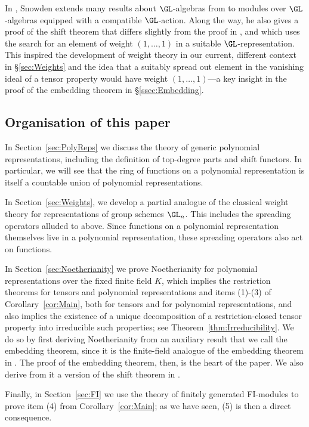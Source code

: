 \documentclass{amsart}
\begin{document}
In \cite{Snowden21}, Snowden extends many results about $\GL$-algebras
from \cite{Bik21} to modules over $\GL$-algebras equipped with a
compatible $\GL$-action.  Along the way, he also gives a proof of the
shift theorem that differs slightly from the proof in \cite{Bik21}, and
which uses the search for an element of weight $(1,\ldots,1)$ in a suitable
$\GL$-representation. This inspired the development of weight theory
in our current, different context in \S\ref{sec:Weights} and the idea
that a suitably spread out element in the vanishing ideal of a tensor
property would have weight $(1,\ldots,1)$---a key insight in the proof of the
embedding theorem in \S\ref{ssec:Embedding}.

\subsection{Organisation of this paper}

In Section~\ref{sec:PolyReps} we discuss the theory of generic polynomial
representations, including the definition of top-degree parts and shift
functors. In particular, we will see that the ring of functions on a
polynomial representation is itself a countable union of polynomial
representations.

In Section~\ref{sec:Weights}, we develop a partial analogue of the
classical weight theory for representations of group schemes $\GL_n$. This
includes the spreading operators alluded to above. Since functions on a
polynomial representation themselves live in a polynomial representation,
these spreading operators also act on functions.

In Section~\ref{sec:Noetherianity} we prove Noetherianity for polynomial
representations over the fixed finite field $K$, which implies the
restriction theorems for tensors and polynomial representations and
items (1)-(3) of Corollary~\ref{cor:Main}, both for tensors and for
polynomial representations, and also implies the existence
of a unique decomposition of a restriction-closed tensor property into 
irreducible such properties; see
Theorem~\ref{thm:Irreducibility}. We do so by first deriving Noetherianity
from an auxiliary result that we call the embedding theorem, since it is
the finite-field analogue of the embedding theorem in \cite{Bik21}. The
proof of the embedding theorem, then, is the heart of the paper. We also
derive from it a version of the shift theorem in \cite{Bik21}.

Finally, in Section~\ref{sec:FI} we use the theory of finitely generated
FI-modules to prove item (4) from Corollary~\ref{cor:Main}; as we have
seen, (5) is then a direct consequence.
\end{document}

